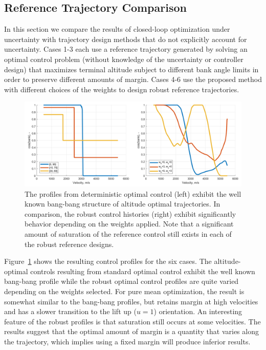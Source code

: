 \documentclass[journal ]{new-aiaa}
\begin{document}
\subsection*{Reference Trajectory Comparison}
In this section we compare the results of closed-loop optimization under uncertainty with trajectory design methods that do not explicitly account for uncertainty. Cases 1-3 each use a reference trajectory generated by solving an optimal control problem (without knowledge of the uncertainty or controller design) that maximizes terminal altitude subject to different bank angle limits in order to preserve different amounts of margin. Cases 4-6 use the proposed method with different choices of the weights to design robust reference trajectories.
\begin{figure}[h!]
	\centering
	\includegraphics[width=1\textwidth]{ddp/comparison_controls}
	\caption{The profiles from deterministic optimal control (left) exhibit the well known bang-bang structure of altitude optimal trajectories. In comparison, the robust control histories (right) exhibit significantly behavior depending on the weights applied. Note that a significant amount of saturation of the reference control still exists in each of the robust reference designs.}
	\label{fig_control_comparison}
\end{figure}
Figure~\ref{fig_control_comparison} shows the resulting control profiles for the six cases. The altitude-optimal controls resulting from standard optimal control exhibit the well known bang-bang profile while the robust optimal control profiles are quite varied depending on the weights selected. For pure mean optimization, the result is somewhat similar to the bang-bang profiles, but retains margin at high velocities and has a slower transition to the lift up ($u=1$) orientation. An interesting feature of the robust profiles is that saturation still occurs at some velocities. The results suggest that the optimal amount of margin is a quantity that varies along the trajectory, which implies using a fixed margin will produce inferior results.
\end{document}
